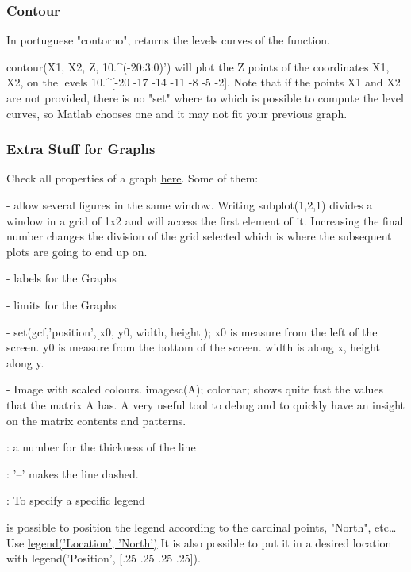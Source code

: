 \subsubsection{Contour}
In portuguese "contorno", returns the levels curves of the function.

contour(X1, X2, Z, 10.\textasciicircum(-20:3:0)') will plot the Z points of the coordinates X1, X2, on the levels 10.\textasciicircum[-20 -17 -14 -11 -8 -5 -2].
Note that if the points X1 and X2 are not provided, there is no "set" where to which is possible to compute the level curves, so Matlab chooses one and it may not fit your previous graph.

\subsubsection{Extra Stuff for Graphs}
Check all properties of a graph \href{https://nl.mathworks.com/help/matlab/ref/matlab.graphics.chart.primitive.line-properties.html}{\uline{here}}. Some of them:

 - allow several figures in the same window.
    Writing subplot(1,2,1) divides a window in a grid of 1x2 and will access the first element of it. Increasing the final number changes the division of the grid selected which is where the subsequent plots are going to end up on.

 - labels for the Graphs

 - limits for the Graphs

 - set(gcf,'position',[x0, y0, width, height]); x0 is measure from the left of the screen. y0 is measure from the bottom of the screen. width is along x, height along y.

 - Image with scaled colours. imagesc(A); colorbar; shows quite fast the values that the matrix A has. A very useful tool to debug and to quickly have an insight on the matrix contents and patterns.

: a number for the thickness of the line 

: '--' makes the line dashed.

: To specify a specific legend

 is possible to position the legend according to the cardinal points, "North", etc\dots Use \uline{legend('Location', 'North')}.It is also possible to put it in a desired location with legend('Position', [.25 .25 .25 .25]).

